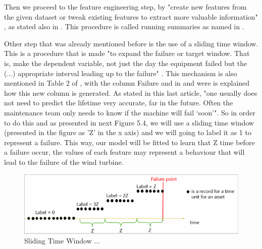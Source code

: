 Then we proceed to the feature engineering step, by "create new features from the given dataset or tweak existing features to extract more valuable information" \cite{ML_Data_processing}, as stated also in \cite{N_7_GENERAL} \cite{MED_1}. This procedure is called running summaries as named in \cite{MED_1}.

Other step that was already mentioned before is the use of a sliding time window. This is a procedure that is made "to expand the failure or target window. That is, make the dependent variable, not just the day the equipment failed but the (...) appropriate interval leading up to the failure" \cite{MED_1}. This mechanism is also mentioned in Table 2 of \cite{N_7_GENERAL}, with the column Failure and in \cite{OLD_19_WIND} and \cite{TDC_1} were is explained how this new column is generated. As stated in this last article, "one usually does not need to predict the lifetime very accurate, far in the future. Often the maintenance team only needs to know if the machine will fail ‘soon'". So in order to do this and as presented in next Figure 5.4, we will use a sliding time window (presented in the figure as 'Z' in the x axis) and we will going to label it as 1 to represent a failure. This way, our model will be fitted to learn that Z time before a failure occur, the values of each feature may represent a behaviour that will lead to the failure of the wind turbine.

\begin{figure}[htbp]
	\centering
	\includegraphics[scale=1.0]{Chapters/Figures/methodology_fig13.png}
	\caption{Sliding Time Window ...
	        \cite{TDC_1}}
	\label{fig:Figuras_Tree_silhouettes-vectorial}
\end{figure}


